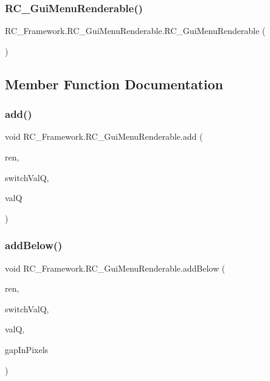 \subsubsection{\texorpdfstring{R\+C\+\_\+\+Gui\+Menu\+Renderable()}{RC\_GuiMenuRenderable()}}
{\footnotesize\ttfamily R\+C\+\_\+\+Framework.\+R\+C\+\_\+\+Gui\+Menu\+Renderable.\+R\+C\+\_\+\+Gui\+Menu\+Renderable (\begin{DoxyParamCaption}{ }\end{DoxyParamCaption})}



\subsection{Member Function Documentation}
\mbox{\label{class_r_c___framework_1_1_r_c___gui_menu_renderable_a6e04c0167c6de417d89aaeb8cfd01585}} 
\subsubsection{\texorpdfstring{add()}{add()}}
{\footnotesize\ttfamily void R\+C\+\_\+\+Framework.\+R\+C\+\_\+\+Gui\+Menu\+Renderable.\+add (\begin{DoxyParamCaption}\item[{\mbox{\hyperlink{class_r_c___framework_1_1_r_c___renderable_bounded}{R\+C\+\_\+\+Renderable\+Bounded}}}]{ren,  }\item[{int}]{switch\+ValQ,  }\item[{float}]{valQ }\end{DoxyParamCaption})}

\mbox{\label{class_r_c___framework_1_1_r_c___gui_menu_renderable_a112c9577a1d1ac24d3eb3f308fc86191}} 
\subsubsection{\texorpdfstring{add\+Below()}{addBelow()}}
{\footnotesize\ttfamily void R\+C\+\_\+\+Framework.\+R\+C\+\_\+\+Gui\+Menu\+Renderable.\+add\+Below (\begin{DoxyParamCaption}\item[{\mbox{\hyperlink{class_r_c___framework_1_1_r_c___renderable_bounded}{R\+C\+\_\+\+Renderable\+Bounded}}}]{ren,  }\item[{int}]{switch\+ValQ,  }\item[{float}]{valQ,  }\item[{int}]{gap\+In\+Pixels }\end{DoxyParamCaption})}

